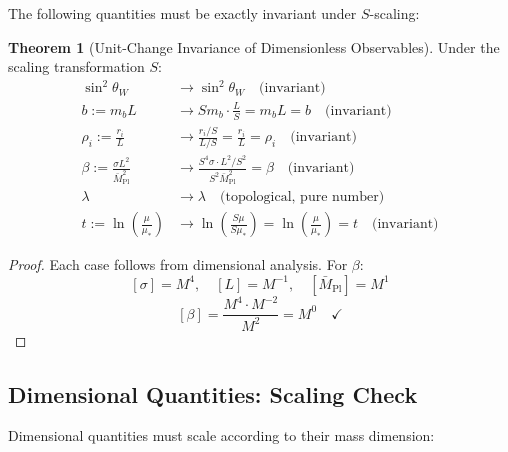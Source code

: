 \documentclass[11pt,a4paper]{article}
\theoremstyle{definition}
\newtheorem{theorem}{Theorem}[section]
\begin{document}
The following quantities must be exactly invariant under $S$-scaling:

\begin{theorem}[Unit-Change Invariance of Dimensionless Observables]
\label{thm:unit_invariance}
Under the scaling transformation $S$:
\begin{align}
\label{eq:inv_sw2}
\sin^2\theta_W &\to \sin^2\theta_W \quad \text{(invariant)} \\
\label{eq:inv_b}
b := m_b L &\to S m_b \cdot \frac{L}{S} = m_b L = b \quad \text{(invariant)} \\
\label{eq:inv_rho}
\rho_i := \frac{r_i}{L} &\to \frac{r_i/S}{L/S} = \frac{r_i}{L} = \rho_i \quad \text{(invariant)} \\
\label{eq:inv_beta}
\beta := \frac{\sigma L^2}{\bar{M}_{\text{Pl}}^2} &\to \frac{S^4 \sigma \cdot L^2/S^2}{S^2 \bar{M}_{\text{Pl}}^2} = \beta \quad \text{(invariant)} \\
\label{eq:inv_lambda}
\lambda &\to \lambda \quad \text{(topological, pure number)} \\
\label{eq:inv_t}
t := \ln\left(\frac{\mu}{\mu_*}\right) &\to \ln\left(\frac{S\mu}{S\mu_*}\right) = \ln\left(\frac{\mu}{\mu_*}\right) = t \quad \text{(invariant)}
\end{align}
\end{theorem}

\begin{proof}
Each case follows from dimensional analysis. For $\beta$:
\begin{equation}
\label{eq:beta_dim_check}
[\sigma] = M^4, \quad [L] = M^{-1}, \quad [\bar{M}_{\text{Pl}}] = M^1
\end{equation}
\begin{equation}
\label{eq:beta_dim_result}
[\beta] = \frac{M^4 \cdot M^{-2}}{M^2} = M^0 \quad \checkmark
\end{equation}
\end{proof}

\subsection{Dimensional Quantities: Scaling Check}
\label{subsec:dim_check}

Dimensional quantities must scale according to their mass dimension:
\end{document}
